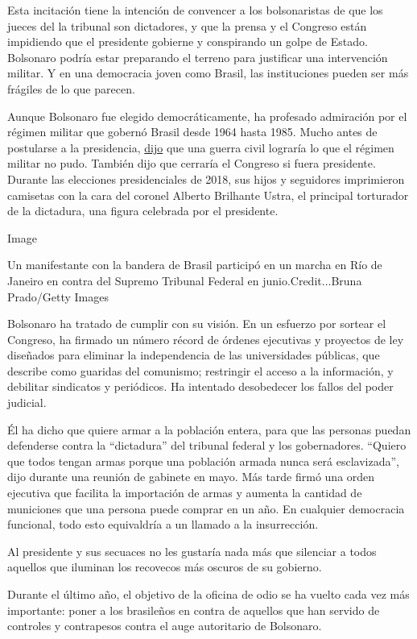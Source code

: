 Esta incitación tiene la intención de convencer a los bolsonaristas de
que los jueces del la tribunal son dictadores, y que la prensa y el
Congreso están impidiendo que el presidente gobierne y conspirando un
golpe de Estado. Bolsonaro podría estar preparando el terreno para
justificar una intervención militar. Y en una democracia joven como
Brasil, las instituciones pueden ser más frágiles de lo que parecen.

Aunque Bolsonaro fue elegido democráticamente, ha profesado admiración
por el régimen militar que gobernó Brasil desde 1964 hasta 1985. Mucho
antes de postularse a la presidencia,
\href{https://www.youtube.com/watch?v=qIDyw9QKIvw\&t=577s}{dijo} que una
guerra civil lograría lo que el régimen militar no pudo. También dijo
que cerraría el Congreso si fuera presidente. Durante las elecciones
presidenciales de 2018, sus hijos y seguidores imprimieron camisetas con
la cara del coronel Alberto Brilhante Ustra, el principal torturador de
la dictadura, una figura celebrada por el presidente.

Image

Un manifestante con la bandera de Brasil participó en un marcha en Río
de Janeiro en contra del Supremo Tribunal Federal en
junio.Credit...Bruna Prado/Getty Images

Bolsonaro ha tratado de cumplir con su visión. En un esfuerzo por
sortear el Congreso, ha firmado un número récord de órdenes ejecutivas y
proyectos de ley diseñados para eliminar la independencia de las
universidades públicas, que describe como guaridas del comunismo;
restringir el acceso a la información, y debilitar sindicatos y
periódicos. Ha intentado desobedecer los fallos del poder judicial.

Él ha dicho que quiere armar a la población entera, para que las
personas puedan defenderse contra la ``dictadura'' del tribunal federal
y los gobernadores. ``Quiero que todos tengan armas porque una población
armada nunca será esclavizada'', dijo durante una reunión de gabinete en
mayo. Más tarde firmó una orden ejecutiva que facilita la importación de
armas y aumenta la cantidad de municiones que una persona puede comprar
en un año. En cualquier democracia funcional, todo esto equivaldría a un
llamado a la insurrección.

Al presidente y sus secuaces no les gustaría nada más que silenciar a
todos aquellos que iluminan los recovecos más oscuros de su gobierno.

Durante el último año, el objetivo de la oficina de odio se ha vuelto
cada vez más importante: poner a los brasileños en contra de aquellos
que han servido de controles y contrapesos contra el auge autoritario de
Bolsonaro.

